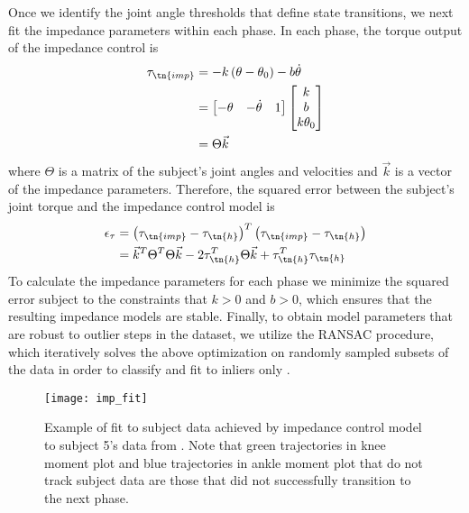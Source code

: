 Once we identify the joint angle thresholds that define state transitions, we
next fit the impedance parameters within each phase. In each phase, the torque
output of the impedance control is 
\begin{align}
    \tau_\tn{imp} &= -k \left( \theta - \theta_0 \right) - b \dot{\theta} \\
        &= \begin{bmatrix} -\theta & -\dot{\theta} & 1 \end{bmatrix}
            \begin{bmatrix} k \\ b \\ k \theta_0 \end{bmatrix} \\
        &= \Theta \vec{k}
\end{align}
where $\Theta$ is a matrix of the subject's joint angles and velocities and
$\vec{k}$ is a vector of the impedance parameters. Therefore, the squared error
between the subject's joint torque and the impedance control model is
\begin{align}
    \epsilon_\tau & = {\left( \tau_\tn{imp} - \tau_\tn{h} \right)}^T 
        \left( \tau_\tn{imp} - \tau_\tn{h} \right) \\
        &= \vec{k}^T \Theta^T \Theta \vec{k} - 2\tau_\tn{h}^T \Theta \vec{k} 
        + \tau_\tn{h}^T \tau_\tn{h}
\end{align}
To calculate the impedance parameters for each phase we minimize the squared
error subject to the constraints that $k>0$ and ${b > 0}$, which ensures that
the resulting impedance models are stable. Finally, to obtain model parameters
that are robust to outlier steps in the dataset, we utilize the RANSAC procedure,
which iteratively solves the above optimization on randomly sampled subsets of
the data in order to classify and fit to inliers only
\citep{fischler1981random}.

\begin{figure}[t]
    \centering 
    \texttt{[image: imp\_fit]}
    \caption[Example of fit to subject data achieved by impedance control model
    to subject 5's data from \citet{moore2015elaborate}]{Example of fit to
    subject data achieved by impedance control model to subject 5's data from
    \citet{moore2015elaborate}. Note that green trajectories in knee moment plot
    and blue trajectories in ankle moment plot that do not track subject data
    are those that did not successfully transition to the next
    phase.}\label{fig:treadmill_imp_fit}
\end{figure}


